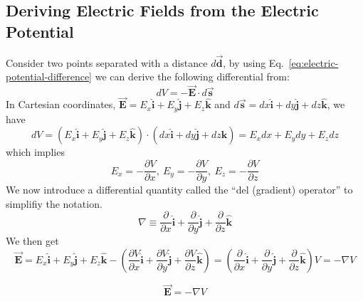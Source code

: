 \subsection{Deriving Electric Fields from the Electric Potential}
Consider two points separated with a distance $d\vec{\boldsymbol{d}}$, by using Eq.~\ref{eq:electric-potential-difference} we can derive the following differential from:
\begin{equation*}
  dV = -\vec{\boldsymbol{E}}\cdot d\vec{\boldsymbol{s}}
\end{equation*}
In Cartesian coordinates, $\vec{\boldsymbol{E}}=E_x\hat{\boldsymbol{i}}+E_y\hat{\boldsymbol{j}}+E_z\hat{\boldsymbol{k}}$ and $d\vec{\boldsymbol{s}}=dx\hat{\boldsymbol{i}}+dy\hat{\boldsymbol{j}}+dz\hat{\boldsymbol{k}}$, we have
\begin{equation*}
  dV = \left(E_x\hat{\boldsymbol{i}}+E_y\hat{\boldsymbol{j}}+E_z\hat{\boldsymbol{k}}\right)\cdot\left(dx\hat{\boldsymbol{i}}+dy\hat{\boldsymbol{j}}+dz\hat{\boldsymbol{k}}\right) = E_xdx + E_ydy + E_zdz
\end{equation*}
which implies
\begin{equation*}
  E_x = -\frac{\partial V}{\partial x},\: E_y = -\frac{\partial V}{\partial y},\: E_z = -\frac{\partial V}{\partial z}
\end{equation*}
We now introduce a differential quantity called the ``del (gradient) operator'' to simplifiy the notation.
\begin{equation*}
  \nabla \equiv \frac{\partial}{\partial x} \hat{\boldsymbol{i}} + \frac{\partial}{\partial y} \hat{\boldsymbol{j}} + \frac{\partial}{\partial z} \hat{\boldsymbol{k}} 
\end{equation*}
We then get 
\begin{equation*}
  \vec{\boldsymbol{E}} =  E_x\hat{\boldsymbol{i}} + E_y\hat{\boldsymbol{j}} + E_z\hat{\boldsymbol{k}}
-\left(\frac{\partial V}{\partial x} \hat{\boldsymbol{i}} + \frac{\partial V}{\partial y} \hat{\boldsymbol{j}} + \frac{\partial V}{\partial z} \hat{\boldsymbol{k}}\right)
  = 
  \left(\frac{\partial}{\partial x} \hat{\boldsymbol{i}} + \frac{\partial}{\partial y} \hat{\boldsymbol{j}} + \frac{\partial}{\partial z} \hat{\boldsymbol{k}}\right)V = -\nabla V
\end{equation*}

\begin{equation*}
  \vec{\boldsymbol{E}} = -\nabla V
\end{equation*}

